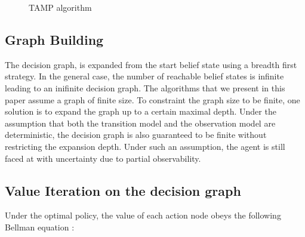 \documentclass[conference]{IEEEtran}
\begin{document}
\begin{figure}
\caption{TAMP algorithm}
\label{fig:algo}
\end{figure}

\subsection{Graph Building} 
The decision graph, is expanded from the start belief state using a breadth first strategy. In the general case, the number of reachable belief states is infinite leading to an inifinite decision graph. The algorithms that we present in this paper assume a graph of finite size. To constraint the graph size to be finite, one solution is to expand the graph up to a certain maximal depth. Under the assumption that both the transition model and the observation model are deterministic, the decision graph is also guaranteed to be finite without restricting the expansion depth. Under such an assumption, the agent is still faced at with uncertainty due to partial observability.

\subsection{Value Iteration on the decision graph} \label{ssec:dp}

Under the optimal policy, the value of each action node obeys the following Bellman equation :
\end{document}
